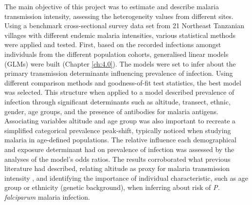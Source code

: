 The main objective of this project was to estimate and describe malaria transmission intensity, assessing the heterogeneity values from different sites.
Using a benchmark cross-sectional survey data set from 21 Northeast Tanzanian villages with different endemic malaria intensities, various statistical methods were applied and tested.
First, based on the recorded infections amongst individuals from the different population cohorts, generalised linear models (GLMs) were built (Chapter \ref{ch:4.0}).
The models were set to infer about the primary transmission determinants influencing prevalence of infection.
Using different comparison methods and goodness-of-fit test statistics, the best model was selected.
This structure when applied to a model described prevalence of infection through significant determinants such as altitude, transect, ethnic, gender, age groups, and the presence of antibodies for malaria antigens.
Associating variables altitude and age group was also important to recreate a simplified categorical prevalence peak-shift, typically noticed when studying malaria in age-defined populations.
The relative influence each demographical and exposure determinant had on prevalence of infection was assessed by the analyses of the model's odds ratios.
The results corroborated what previous literature had described, relating altitude as proxy for malaria transmission intensity \cite{drakeley2005altitude, bodker2003relationship}, and identifying the importance of individual characteristic, such as age group \cite{carneiro2010age} or ethnicity (genetic background), when inferring about risk of \textit{P. falciparum} malaria infection.
